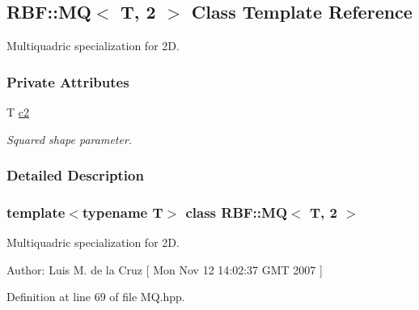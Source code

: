 \hypertarget{classRBF_1_1MQ_3_01T_00_012_01_4}{
\subsection{RBF::MQ$<$ T, 2 $>$ Class Template Reference}
\label{classRBF_1_1MQ_3_01T_00_012_01_4}
}
Multiquadric specialization for 2D.  


\subsubsection*{Private Attributes}
\begin{CompactItemize}
\item 
\hypertarget{classRBF_1_1MQ_3_01T_00_012_01_4_a1227a4e5c78468b01558a0791702332}{
T \hyperlink{classRBF_1_1MQ_3_01T_00_012_01_4_a1227a4e5c78468b01558a0791702332}{c2}}
\label{classRBF_1_1MQ_3_01T_00_012_01_4_a1227a4e5c78468b01558a0791702332}

\begin{CompactList}\small\item\em Squared shape parameter. \item\end{CompactList}\end{CompactItemize}


\subsubsection{Detailed Description}
\subsubsection*{template$<$typename T$>$ class RBF::MQ$<$ T, 2 $>$}

Multiquadric specialization for 2D. 

\begin{Desc}
\item[Author:]Luis M. de la Cruz \mbox{[} Mon Nov 12 14:02:37 GMT 2007 \mbox{]} \end{Desc}


Definition at line 69 of file MQ.hpp.